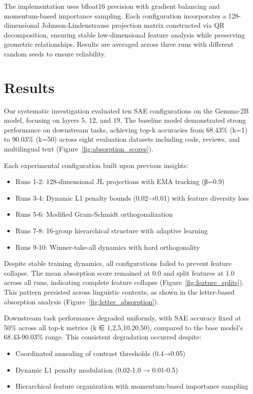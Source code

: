 \documentclass{article} %
\begin{document}
The implementation uses bfloat16 precision with gradient balancing and momentum-based importance sampling. Each configuration incorporates a 128-dimensional Johnson-Lindenstrauss projection matrix constructed via QR decomposition, ensuring stable low-dimensional feature analysis while preserving geometric relationships. Results are averaged across three runs with different random seeds to ensure reliability.

\section{Results}
\label{sec:results}

Our systematic investigation evaluated ten SAE configurations on the Gemma-2B model, focusing on layers 5, 12, and 19. The baseline model demonstrated strong performance on downstream tasks, achieving top-k accuracies from 68.43\% (k=1) to 90.03\% (k=50) across eight evaluation datasets including code, reviews, and multilingual text (Figure~\ref{fig:absorption_scores}).

Each experimental configuration built upon previous insights:

\begin{itemize}
\item Runs 1-2: 128-dimensional JL projections with EMA tracking (β=0.9)
\item Runs 3-4: Dynamic L1 penalty bounds (0.02→0.01) with feature diversity loss
\item Runs 5-6: Modified Gram-Schmidt orthogonalization
\item Runs 7-8: 16-group hierarchical structure with adaptive learning
\item Runs 9-10: Winner-take-all dynamics with hard orthogonality
\end{itemize}

Despite stable training dynamics, all configurations failed to prevent feature collapse. The mean absorption score remained at 0.0 and split features at 1.0 across all runs, indicating complete feature collapse (Figure~\ref{fig:feature_splits}). This pattern persisted across linguistic contexts, as shown in the letter-based absorption analysis (Figure~\ref{fig:letter_absorption}).

Downstream task performance degraded uniformly, with SAE accuracy fixed at 50\% across all top-k metrics (k ∈ {1,2,5,10,20,50}), compared to the base model's 68.43-90.03\% range. This consistent degradation occurred despite:

\begin{itemize}
\item Coordinated annealing of contrast thresholds (0.4→0.05)
\item Dynamic L1 penalty modulation (0.02-1.0 → 0.01-0.5)
\item Hierarchical feature organization with momentum-based importance sampling
\end{itemize}
\end{document}
